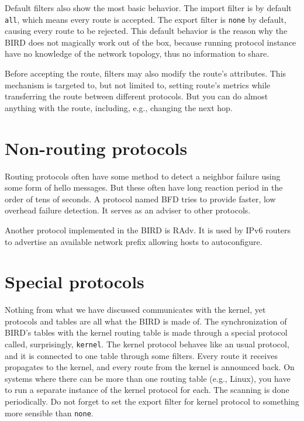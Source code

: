 Default filters also show the most basic behavior. The import filter is by default
\texttt{all}, which means every route is accepted. The export filter is
\texttt{none} by default, causing every route to be rejected. This default
behavior is the reason why the BIRD does not magically work out of the box,
because running protocol instance have no knowledge of the network topology,
thus no information to share.

Before accepting the route, filters may also modify the route's attributes.
This mechanism is targeted to, but not limited to, setting route's metrics
while transferring the route between different protocols. But you can do almost
anything with the route, including, e.g., changing the next hop.

\section{Non-routing protocols}
Routing protocols often have some method to detect a neighbor failure using
some form of hello messages. But these often have long reaction period in the
order of tens of seconds. A protocol named BFD tries to provide faster, low
overhead failure detection. It serves as an adviser to other protocols.

Another protocol implemented in the BIRD is RAdv. It is used by IPv6 routers to
advertise an available network prefix allowing hosts to autoconfigure.

\section{Special protocols}
Nothing from what we have discussed communicates with the kernel, yet protocols
and tables are all what the BIRD is made of. The synchronization of BIRD's
tables with the kernel routing table is made through a special protocol
called, surprisingly, \texttt{kernel}. The kernel protocol behaves like an usual
protocol, and it is connected to one table through some filters. Every route it
receives propagates to the kernel, and every route from the kernel is announced
back. On systems where there can be more than one routing table (e.g., Linux),
you have to run a separate instance of the kernel protocol for each. The
scanning is done periodically. Do not forget to set the export filter for
kernel protocol to something more sensible than \texttt{none}.


